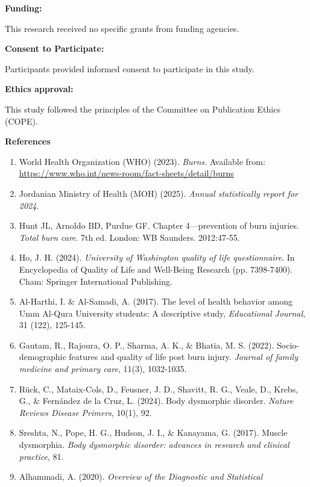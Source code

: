 \documentclass[
]{article}
\begin{document}
\textbf{Funding:}

This research received no specific grants from funding agencies.

\textbf{Consent to Participate:}

Participants provided informed consent to participate in this study.

\textbf{Ethics approval:}

This study followed the principles of the Committee on Publication
Ethics (COPE).

\textbf{\hfill\break
}

\textbf{References}

\begin{enumerate}
\def\labelenumi{\arabic{enumi}.}
\item
  World Health Organization (WHO) (2023). \emph{Burns}. Available from:
  \href{https://www.who.int/news-room/fact-sheets/detail/burns}{\ul{https://www.who.int/news-room/fact-sheets/detail/burns}}
\item
  Jordanian Ministry of Health (MOH) (2025). \emph{Annual statistically
  report for 2024}.
\item
  Hunt JL, Arnoldo BD, Purdue GF. Chapter 4---prevention of burn
  injuries. \emph{Total burn care}. 7th ed. London: WB Saunders.
  2012:47‑55.
\item
  Ho, J. H. (2024). \emph{University of Washington quality of life
  questionnaire}. In Encyclopedia of Quality of Life and Well-Being
  Research (pp. 7398-7400). Cham: Springer International Publishing.
\item
  Al-Harthi, I. \& Al-Samadi, A. (2017). The level of health behavior
  among Umm Al-Qura University students: A descriptive study,
  \emph{Educational Journal}, 31 (122), 125-145.
\item
  Gautam, R., Rajoura, O. P., Sharma, A. K., \& Bhatia, M. S. (2022).
  Socio-demographic features and quality of life post burn injury.
  \emph{Journal of family medicine and primary care}, 11(3), 1032-1035.
\item
  Rück, C., Mataix-Cols, D., Feusner, J. D., Shavitt, R. G., Veale, D.,
  Krebs, G., \& Fernández de la Cruz, L. (2024). Body dysmorphic
  disorder. \emph{Nature Reviews Disease Primers}, 10(1), 92.
\item
  Sreshta, N., Pope, H. G., Hudson, J. I., \& Kanayama, G. (2017).
  Muscle dysmorphia. \emph{Body dysmorphic disorder: advances in
  research and clinical practice}, 81.
\item
  Alhammadi, A. (2020). \emph{Overview of the Diagnostic and Statistical
}
\end{enumerate}
\end{document}
